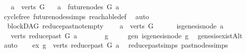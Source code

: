 \begin{isabellebody}
\ \ \ {\isachardoublequoteopen}a\ {\isasymin}\ verts\ G{\isachardoublequoteclose}\isanewline
\ \ \ {\isachardoublequoteopen}a\ {\isasymnotin}\ future{\isacharunderscore}{\kern0pt}nodes\ G\ a{\isachardoublequoteclose}\isanewline
%
\isadelimproof
\ \ %
\endisadelimproof
%
\isatagproof
{}\isamarkupfalse%
\ cycle{\isacharunderscore}{\kern0pt}free\ future{\isacharunderscore}{\kern0pt}nodes{\isachardot}{\kern0pt}simps\ reachable{\isacharunderscore}{\kern0pt}def\ \isamarkupfalse%
\ auto%
\endisatagproof
{\isafoldproof}%
%
\isadelimproof
%
\endisadelimproof
%
\isadelimdocument
%
\endisadelimdocument
%
\isatagdocument
%
\isamarkuptrue%
%
\endisatagdocument
{\isafolddocument}%
%
\isadelimdocument
%
\endisadelimdocument
{}\isamarkupfalse%
\ {\isacharparenleft}{\kern0pt}\ blockDAG{\isacharparenright}{\kern0pt}\ reduce{\isacharunderscore}{\kern0pt}past{\isacharunderscore}{\kern0pt}not{\isacharunderscore}{\kern0pt}empty{\isacharcolon}{\kern0pt}\isanewline
\ \ \ {\isachardoublequoteopen}\ a\ {\isasymin}\ verts\ G{\isachardoublequoteclose}\isanewline
\ \ \ \ \ \ {\isachardoublequoteopen}{\isasymnot}is{\isacharunderscore}{\kern0pt}genesis{\isacharunderscore}{\kern0pt}node\ a{\isachardoublequoteclose}\isanewline
\ \ \ {\isachardoublequoteopen}{\isacharparenleft}{\kern0pt}verts\ {\isacharparenleft}{\kern0pt}reduce{\isacharunderscore}{\kern0pt}past\ G\ a{\isacharparenright}{\kern0pt}{\isacharparenright}{\kern0pt}\ {\isasymnoteq}\ {\isacharbraceleft}{\kern0pt}{\isacharbraceright}{\kern0pt}{\isachardoublequoteclose}\isanewline
%
\isadelimproof
%
\endisadelimproof
%
\isatagproof
{}\isamarkupfalse%
\ {\isacharminus}{\kern0pt}\isanewline
\ \ \isamarkupfalse%
\ g\isanewline
\ \ \ \ \ gen{\isacharcolon}{\kern0pt}\ {\isachardoublequoteopen}is{\isacharunderscore}{\kern0pt}genesis{\isacharunderscore}{\kern0pt}node\ g{\isachardoublequoteclose}\ \isamarkupfalse%
\ genesis{\isacharunderscore}{\kern0pt}existAlt\ \isamarkupfalse%
\ auto\isanewline
\ \ \isamarkupfalse%
\ ex{\isacharcolon}{\kern0pt}\ {\isachardoublequoteopen}g\ {\isasymin}\ verts\ {\isacharparenleft}{\kern0pt}reduce{\isacharunderscore}{\kern0pt}past\ G\ a{\isacharparenright}{\kern0pt}{\isachardoublequoteclose}\ \isamarkupfalse%
\ reduce{\isacharunderscore}{\kern0pt}past{\isachardot}{\kern0pt}simps\ past{\isacharunderscore}{\kern0pt}nodes{\isachardot}{\kern0pt}simps\ \isanewline

\end{isabellebody}
